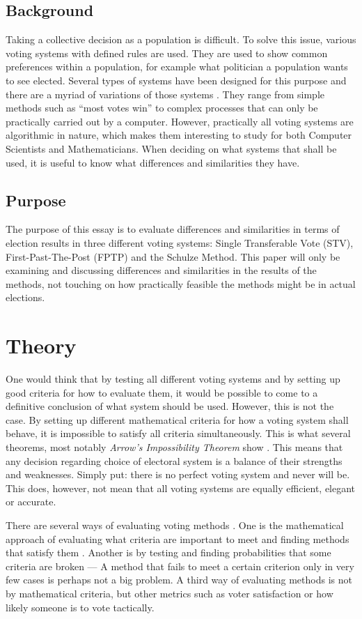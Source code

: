 \documentclass[12pt]{article}
\begin{document}
\subsection{Background}
Taking a collective decision as a population is difficult. To solve this issue, various voting systems with defined rules are used. They are used to show common preferences within a population, for example what politician a population wants to see elected. Several types of systems have been designed for this purpose and there are a myriad of variations of those systems \autocite{fairvoteND}. They range from simple methods such as “most votes win” to complex processes that can only be practically carried out by a computer. However, practically all voting systems are algorithmic in nature, which makes them interesting to study for both Computer Scientists and Mathematicians. When deciding on what systems that shall be used, it is useful to know what differences and similarities they have.
\subsection{Purpose}
The purpose of this essay is to evaluate differences and similarities in terms of election results in three different voting systems: Single Transferable Vote (STV), First-Past-The-Post (FPTP) and the Schulze Method. This paper will only be examining and discussing differences and similarities in the results of the methods, not touching on how practically feasible the methods might be in actual elections.
\pagebreak
\section{Theory}
One would think that by testing all different voting systems and by setting up good criteria for how to evaluate them, it would be possible to come to a definitive conclusion of what system should be used. However, this is not the case. By setting up different mathematical criteria for how a voting system shall behave, it is impossible to satisfy all criteria simultaneously. This is what several theorems, most notably \textit{Arrow's Impossibility Theorem} show \autocite{arrow1950difficulty}. This means that any decision regarding choice of electoral system is a balance of their strengths and weaknesses. Simply put: there is no perfect voting system and never will be. This does, however, not mean that all voting systems are equally efficient, elegant or accurate.

There are several ways of evaluating voting methods \autocite{green-armytageND}. One is the mathematical approach of evaluating what criteria are important to meet and finding methods that satisfy them \autocite{woodwall1994}. Another is by testing and finding probabilities that some criteria are broken — A method that fails to meet a certain criterion only in very few cases is perhaps not a big problem. A third way of evaluating methods is not by mathematical criteria, but other metrics such as voter satisfaction or how likely someone is to vote tactically.
\end{document}
